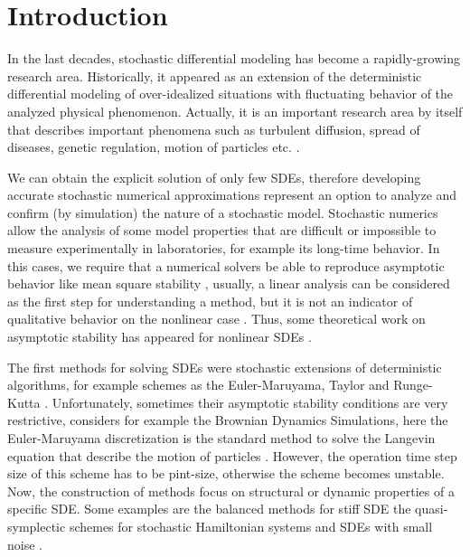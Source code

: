\section{Introduction}
	In the last decades, stochastic differential modeling has become a rapidly-growing research area. Historically, it 
	appeared as an extension of the deterministic differential modeling of over-idealized situations with fluctuating 
	behavior of the analyzed physical phenomenon.  Actually, it is an important research area by itself that describes 
	important phenomena such as turbulent diffusion, spread of diseases, genetic regulation, motion of 
	particles etc. \cite{Allen2007, Gardiner2009, VanKampen1992}. 

		We can obtain the explicit solution of only few SDEs, therefore developing accurate stochastic
	numerical approximations represent  an option to analyze and confirm (by simulation) the nature of a 
	stochastic model. Stochastic numerics allow the  analysis of some  model properties that are
	difficult or impossible to measure experimentally in laboratories, for example its
	long-time behavior. In this cases, we require that a numerical solvers
	be able to reproduce asymptotic behavior like mean square stability \cite{Higham2000,Higham2000b,Saito1996a},
	usually, a linear  analysis can be considered as the first step for understanding a method, but it is not 
	an indicator of qualitative behavior on the nonlinear case \cite{kloeden1999towards}. Thus, some theoretical 
	work on asymptotic	stability has appeared for nonlinear SDEs \citet{Bokor2003} \citet{Buckwar2011a}.  
	
		The first methods for solving SDEs were stochastic extensions of deterministic algorithms,
	for example schemes as the Euler-Maruyama, Taylor and Runge-Kutta \cite{Bokor2003,Burrage2004, Kloeden1992}.
	Unfortunately, sometimes their asymptotic stability conditions are very restrictive, considers for
	example the Brownian Dynamics Simulations, here the Euler-Maruyama discretization is the standard method to 
	solve the Langevin equation that describe the motion of particles \cite{Braanka1998, Bussi2007, Ermak1978}. 
	However, the operation time step size of this scheme has to be pint-size, otherwise the scheme becomes unstable. 
	Now, the construction of methods focus on structural or dynamic properties of a specific SDE.
	Some examples are the balanced methods for stiff SDE \cite{Milstein1998a} the quasi-symplectic schemes for
	stochastic Hamiltonian systems \cite{Milstein2003} and SDEs with small noise \cite{Buckwar2006b}.
	
